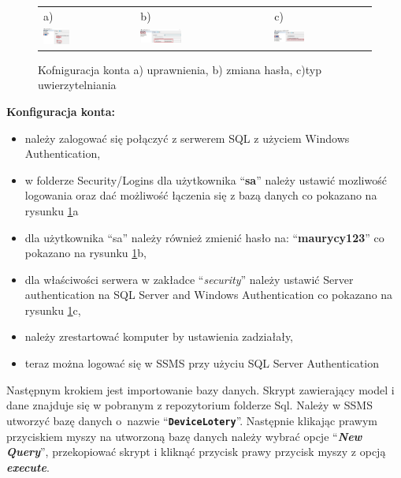 \begin{figure}[htb]
  \centering
	\begin{tabular}{@{}lll@{}}
	a) & b) & c) \\
  \includegraphics[width=0.300\textwidth]{rysA/status.pdf} & 
	\includegraphics[width=0.333\textwidth]{rysA/general.pdf} &
	\includegraphics[width=0.320\textwidth]{rysA/enable.pdf}
	\end{tabular}
  \caption{Kofniguracja konta a) uprawnienia, b) zmiana hasła, c)typ uwierzytelniania }
  \label{sa:label}
\end{figure}

\newpage
\textbf{Konfiguracja konta:}
\begin{itemize}
\item należy zalogować się połączyć z serwerem SQL z użyciem Windows Authentication,
\item w folderze Security/Logins dla użytkownika "`\textbf{sa}"' należy ustawić mozliwość logowania oraz dać możliwość łączenia się z bazą danych co pokazano na rysunku \ref{sa:label}a
\item dla użytkownika "`sa"' należy również zmienić hasło na: "`\textbf{maurycy123}"' co pokazano na rysunku \ref{sa:label}b,
\item dla właściwości serwera w zakładce "`\emph{security}"' należy ustawić Server authentication na SQL Server and Windows Authentication co pokazano na rysunku \ref{sa:label}c, 
\item należy zrestartować komputer by ustawienia zadziałały,
\item teraz można logować się w SSMS przy użyciu SQL Server Authentication
\end{itemize}

Następnym krokiem jest importowanie bazy danych. Skrypt zawierający model i dane znajduje się w pobranym z repozytorium folderze Sql. Należy w SSMS utworzyć bazę danych o~nazwie "`\textbf{\texttt{DeviceLotery}}"'. Następnie klikając prawym przyciskiem myszy na utworzoną bazę danych należy wybrać opcje "`\textbf{\emph{New Query}}"', przekopiować skrypt i kliknąć przycisk prawy przycisk myszy z opcją \textbf{\emph{execute}}.

